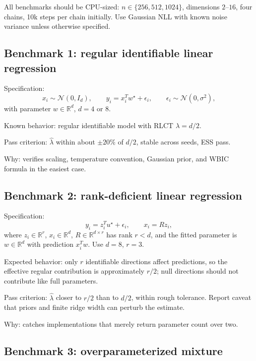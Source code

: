 \documentclass[11pt]{article}
\begin{document}
All benchmarks should be CPU-sized: $n\in\{256,512,1024\}$, dimensions $2$--$16$, four chains, 10k steps per chain initially.  Use Gaussian NLL with known noise variance unless otherwise specified.

\subsection{Benchmark 1: regular identifiable linear regression}

Specification:
\begin{equation}
  x_i\sim\mathcal{N}(0,I_d),\qquad
  y_i = x_i^T w^\star + \epsilon_i,
  \qquad \epsilon_i\sim\mathcal{N}(0,\sigma^2),
\end{equation}
with parameter $w\in\mathbb{R}^d$, $d=4$ or $8$.

Known behavior: regular identifiable model with RLCT $\lambda=d/2$.

Pass criterion: $\hat\lambda$ within about $\pm20\%$ of $d/2$, stable across seeds, ESS pass.

Why: verifies scaling, temperature convention, Gaussian prior, and WBIC formula in the easiest case.

\subsection{Benchmark 2: rank-deficient linear regression}

Specification:
\begin{equation}
  y_i = z_i^T u^\star + \epsilon_i,
  \qquad x_i = R z_i,
\end{equation}
where $z_i\in\mathbb{R}^r$, $x_i\in\mathbb{R}^d$, $R\in\mathbb{R}^{d\times r}$ has rank $r<d$, and the fitted parameter is $w\in\mathbb{R}^d$ with prediction $x_i^T w$.  Use $d=8$, $r=3$.

Expected behavior: only $r$ identifiable directions affect predictions, so the effective regular contribution is approximately $r/2$; null directions should not contribute like full parameters.

Pass criterion: $\hat\lambda$ closer to $r/2$ than to $d/2$, within rough tolerance.  Report caveat that priors and finite ridge width can perturb the estimate.

Why: catches implementations that merely return parameter count over two.

\subsection{Benchmark 3: overparameterized mixture}
\end{document}
